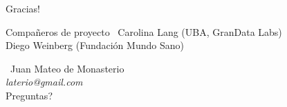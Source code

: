 \documentclass[xcolor=x11names]{beamer}
\begin{document}

\begin{frame}{Gracias! }
	
	\begin{block}{Compañeros de proyecto}
					\center\
					Carolina Lang (UBA, GranData Labs) \\
					 Diego Weinberg (Fundación Mundo Sano) \\
	\end{block}

				\center\
				Juan Mateo de Monasterio \\
				\textit{laterio@gmail.com} \\
				Preguntas? \\

\end{frame}




\justifying%
% 
% 


\vfill
\end{document}
